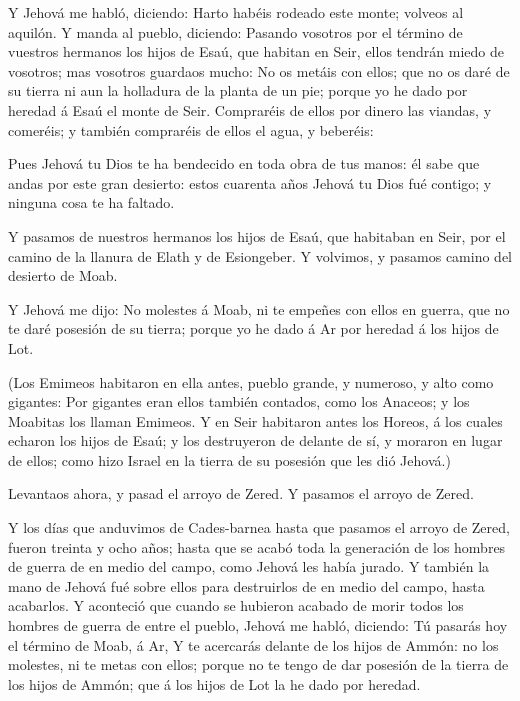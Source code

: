  Y Jehová me habló, diciendo:  Harto habéis
rodeado este monte; volveos al aquilón.  Y manda al pueblo,
diciendo: Pasando vosotros por el término de vuestros hermanos los hijos
de Esaú, que habitan en Seir, ellos tendrán miedo de vosotros; mas
vosotros guardaos mucho:  No os metáis con ellos; que no os
daré de su tierra ni aun la holladura de la planta de un pie; porque yo
he dado por heredad á Esaú el monte de Seir.  Compraréis de
ellos por dinero las viandas, y comeréis; y también compraréis de ellos
el agua, y beberéis:

 Pues Jehová tu Dios te ha bendecido en toda obra de tus
manos: él sabe que andas por este gran desierto: estos cuarenta años
Jehová tu Dios fué contigo; y ninguna cosa te ha faltado.

 Y pasamos de nuestros hermanos los hijos de Esaú, que
habitaban en Seir, por el camino de la llanura de Elath y de Esiongeber.
Y volvimos, y pasamos camino del desierto de Moab.

 Y Jehová me dijo: No molestes á Moab, ni te empeñes con
ellos en guerra, que no te daré posesión de su tierra; porque yo he dado
á Ar por heredad á los hijos de Lot.

 (Los Emimeos habitaron en ella antes, pueblo grande, y
numeroso, y alto como gigantes:  Por gigantes eran ellos
también contados, como los Anaceos; y los Moabitas los llaman Emimeos.
 Y en Seir habitaron antes los Horeos, á los cuales echaron
los hijos de Esaú; y los destruyeron de delante de sí, y moraron en
lugar de ellos; como hizo Israel en la tierra de su posesión que les dió
Jehová.)

 Levantaos ahora, y pasad el arroyo de Zered. Y pasamos el
arroyo de Zered.

 Y los días que anduvimos de Cades-barnea hasta que pasamos
el arroyo de Zered, fueron treinta y ocho años; hasta que se acabó toda
la generación de los hombres de guerra de en medio del campo, como
Jehová les había jurado.  Y también la mano de Jehová fué
sobre ellos para destruirlos de en medio del campo, hasta acabarlos.
 Y aconteció que cuando se hubieron acabado de morir todos
los hombres de guerra de entre el pueblo,  Jehová me habló,
diciendo:  Tú pasarás hoy el término de Moab, á Ar,
 Y te acercarás delante de los hijos de Ammón: no los
molestes, ni te metas con ellos; porque no te tengo de dar posesión de
la tierra de los hijos de Ammón; que á los hijos de Lot la he dado por
heredad.

